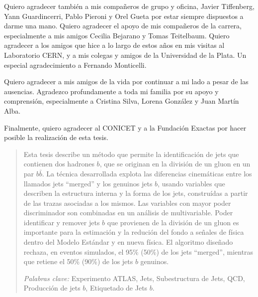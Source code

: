 \documentclass[11pt,a4paper,12pt]{report}
\begin{document}
Quiero agradecer tambi\'en a mis  compa\~neros de grupo y oficina, Javier Tiffenberg, Yann Guardincerri, Pablo Pieroni y Orel Gueta por estar siempre dispuestos a darme una mano. Quiero agradecer el apoyo de mis compa\~neros de la carrera, especialmente a mis amigos Cecilia Bejarano y Tomas Teitelbaum. Quiero agradecer a los amigos que hice a lo largo de estos a\~nos en mis visitas al Laboratorio CERN, y a mis colegas y amigos de la Universidad de la Plata. Un especial agradecimiento a Fernando Monticelli.

Quiero agradecer a mis amigos de la vida por continuar a mi lado a pesar de las ausencias. Agradezco profundamente a toda mi familia por su apoyo y comprensi\'on, especialmente a Cristina Silva, Lorena Gonz\'alez y Juan Mart\'in Alba.

Finalmente, quiero agradecer al CONICET y a la Fundaci\'on Exactas por hacer posible la realizaci\'on de esta tesis.





\begin{abstract}

Esta tesis describe un m\'etodo que permite la identificaci\'on de jets que contienen dos hadrones $b$, que se originan en la divisi\'on de un gluon en un par $b\bar{b}$. 
La t\'ecnica desarrollada explota las diferencias cinem\'aticas entre los llamados jets ``merged'' y los genuinos jets $b$, usando variables que describen la estructura interna y la forma de los jets, constru\'idas a partir de las trazas asociadas a los mismos. Las variables con mayor poder discriminador son combinadas en un an\'alisis de multivariable.
Poder identificar y remover jets $b$ que provienen de la divisi\'on de un gluon es importante para la estimaci\'on y la reduci\'on del fondo a se\~nales de f\'isica dentro del Modelo Est\'andar y en nueva f\'isica.
El algoritmo dise\~nado rechaza, en eventos simulados, el 95\% (50\%) de los jets ``merged'', mientras que retiene el 50\% (90\%) de los jets $b$ genuinos.


\vspace{1.5cm}
\emph{Palabras clave:} Experimento ATLAS, Jets, Subestructura de Jets, QCD, Producci\'on de jets $b$,  Etiquetado de Jets $b$.
\end{abstract}


\end{document}
